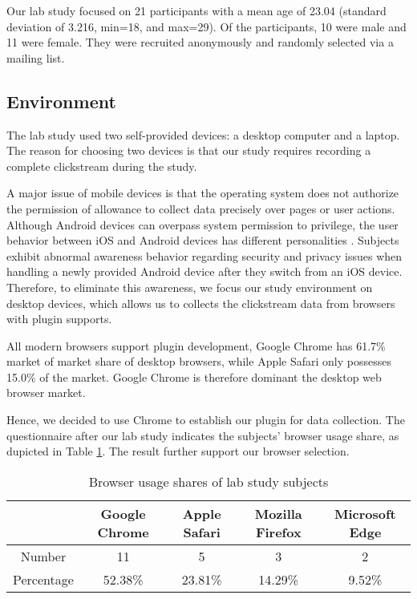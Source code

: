 Our lab study focused on 21 participants with a mean age of 23.04 (standard deviation of 3.216, 
min=18, and max=29). Of the participants, 10 were male and 11 were female. They were recruited 
anonymously and randomly selected via a mailing list.

\subsection{Environment}

The lab study used two self-provided devices: a desktop computer and a laptop.
The reason for choosing two devices is that our study requires recording
a complete clickstream during the study.

A major issue of mobile devices is that the operating system does not
authorize the permission of allowance to collect data precisely over pages or user actions.
Although Android devices can overpass system permission to privilege, the user behavior 
between iOS and Android devices has different personalities \cite{sandoio2018android}. 
Subjects exhibit \cite{reinfelder2014androidios} abnormal awareness behavior 
regarding security and privacy issues when handling a newly provided Android device 
after they switch from an iOS device.
Therefore, to eliminate this awareness, we focus our study environment on desktop devices,
which allows us to collects the clickstream data from browsers with plugin supports.

All modern browsers support plugin development, Google Chrome \cite{wiki2018share} has 61.7\% 
market of market share of desktop browsers, 
while Apple Safari only possesses 15.0\% of the market. 
Google Chrome is therefore dominant the desktop web browser market.

Hence, we decided to use Chrome to establish our plugin for data collection.
The questionnaire after our lab study indicates the subjects' browser usage share, 
as dupicted in Table \ref{table:sharesubjects}. The result further support our 
browser selection.

\begin{table}[H]
    \small
    \centering
    \setlength{\belowcaptionskip}{10pt}
    \caption{Browser usage shares of lab study subjects}
    \begin{tabular}{ccccc}
          \toprule
        & \textbf{Google Chrome} & \textbf{Apple Safari} & \textbf{Mozilla Firefox} & \textbf{Microsoft Edge} \\
          \hline
          Number     & 11 & 5 & 3 & 2 \\
          Percentage & 52.38\% & 23.81\% & 14.29\% & 9.52\% \\
          \bottomrule
    \end{tabular}
    \label{table:sharesubjects}
\end{table}


